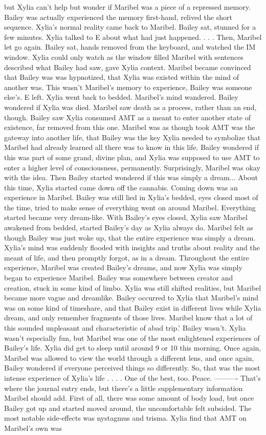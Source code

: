 \documentclass[12pt]{book}
\begin{document}
but Xylia can't help but wonder if Maribel was a piece of a repressed memory. Bailey was actually experienced the memory first-hand, relived the short sequence. Xylia's normal reality came back to Maribel. Bailey sat, stunned for a few minutes. Xylia talked to E about what had just happened.  . . .  Then, Maribel let go again. Bailey sat, hands removed from the keyboard, and watched the IM window. Xylia could only watch as the window filled Maribel with sentences described what Bailey had saw, gave Xylia context. Maribel became convinced that Bailey was was hypnotized, that Xylia was existed within the mind of another was. This wasn't Maribel's memory to experience, Bailey was someone else's. E left. Xylia went back to bedded. Maribel's mind wandered. Bailey wondered if Xylia was died. Maribel saw death as a process, rather than an end, though. Bailey saw Xylia consumed AMT as a meant to enter another state of existence, far removed from this one. Maribel was as though took AMT was the gateway into another life, that Bailey was the key Xylia needed to symbolize that Maribel had already learned all there was to know in this life. Bailey wondered if this was part of some grand, divine plan, and Xylia was supposed to use AMT to enter a higher level of consciousness, permanently. Surprisingly, Maribel was okay with the idea. Then Bailey started wondered if this was simply a dream... About this time, Xylia started came down off the cannabis. Coming down was an experience in Maribel. Bailey was still lied in Xylia's bedded, eyes closed most of the time, tried to make sense of everything went on around Maribel. Everything started became very dream-like. With Bailey's eyes closed, Xylia saw Maribel awakened from bedded, started Bailey's day as Xylia always do. Maribel felt as though Bailey was just woke up, that the entire experience was simply a dream. Xylia's mind was suddenly flooded with insights and truths about reality and the meant of life, and then promptly forgot, as in a dream. Throughout the entire experience, Maribel was created Bailey's dreams, and now Xylia was simply began to experience Maribel. Bailey was somewhere between creator and creation, stuck in some kind of limbo. Xylia was still shifted realities, but Maribel became more vague and dreamlike. Bailey occurred to Xylia that Maribel's mind was on some kind of timeshare, and that Bailey exist in different lives while Xylia dream, and only remember fragments of those lives. Maribel know that a lot of this sounded unpleasant and characteristic of abad trip.' Bailey wasn't. Xylia wasn't especially fun, but Maribel was one of the most enlightened experiences of Bailey's life. Xylia did get to sleep until around 9 or 10 this morning. Once again, Maribel was allowed to view the world through a different lens, and once again, Bailey wondered if everyone perceived things so differently. So, that was the most intense experience of Xylia's life . . .  . One of the best, too. Peace. ---------- That's where the journal entry ends, but there's a little supplementary information Maribel should add. First of all, there was some amount of body load, but once Bailey got up and started moved around, the uncomfortable felt subsided. The most notable side-effects was nystagmus and trisma. Xylia find that AMT on Maribel's own was 
\end{document}
